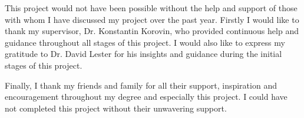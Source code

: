 This project would not have been possible without the help and support of those with whom I have discussed my project over the past year. Firstly I would like to thank my supervisor, Dr. Konstantin Korovin, who provided continuous help and guidance throughout all stages of this project. I would also like to express my gratitude to Dr. David Lester for his insights and guidance during the initial stages of this project.

Finally, I thank my friends and family for all their support, inspiration and encouragement throughout my degree and especially this project. I could have not completed this project without their unwavering support.